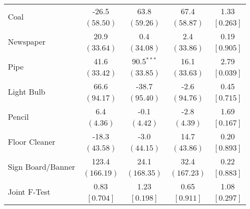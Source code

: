 \begin{tabular}{lcccc}
 \multirow{2}{*}{Coal}  &  -26.5 &   63.8 &   67.4 &   1.33 \\ 
 & $ \left( 58.50\right) $  & $ \left( 59.26\right) $  & $ \left( 58.87\right) $  & $ \left[ 0.263\right] $  \\ [0.25em] 
 \multirow{2}{*}{Newspaper}  &   20.9 &    0.4 &    2.4 &   0.19 \\ 
 & $ \left( 33.64\right) $  & $ \left( 34.08\right) $  & $ \left( 33.86\right) $  & $ \left[ 0.905\right] $  \\ [0.25em] 
 \multirow{2}{*}{Pipe}  &   41.6 &   90.5$^{***}$ &   16.1 &   2.79 \\ 
 & $ \left( 33.42\right) $  & $ \left( 33.85\right) $  & $ \left( 33.63\right) $  & $ \left[ 0.039\right] $  \\ [0.25em] 
 \multirow{2}{*}{Light Bulb}  &   66.6 &  -38.7 &   -2.6 &   0.45 \\ 
 & $ \left( 94.17\right) $  & $ \left( 95.40\right) $  & $ \left( 94.76\right) $  & $ \left[ 0.715\right] $  \\ [0.25em] 
 \multirow{2}{*}{Pencil}  &    6.4 &   -0.1 &   -2.8 &   1.69 \\ 
 & $ \left(  4.36\right) $  & $ \left(  4.42\right) $  & $ \left(  4.39\right) $  & $ \left[ 0.167\right] $  \\ [0.25em] 
 \multirow{2}{*}{Floor Cleaner}  &  -18.3 &   -3.0 &   14.7 &   0.20 \\ 
 & $ \left( 43.58\right) $  & $ \left( 44.15\right) $  & $ \left( 43.86\right) $  & $ \left[ 0.893\right] $  \\ [0.25em] 
 \multirow{2}{*}{Sign Board/Banner}  &  123.4 &   24.1 &   32.4 &   0.22 \\ 
 & $ \left(166.19\right) $  & $ \left(168.35\right) $  & $ \left(167.23\right) $  & $ \left[ 0.883\right] $  \\ [0.25em] 
 \midrule 
 \multirow{2}{*}{Joint F-Test}  &   0.83 &   1.23 &   0.65 &   1.08 \\ 
 & $ \left[ 0.704 \right] $  & $ \left[ 0.198 \right] $  & $ \left[ 0.911 \right] $  & $ \left[ 0.297\right] $ \\ [0.25em]
 \bottomrule 
 \end{tabular}
